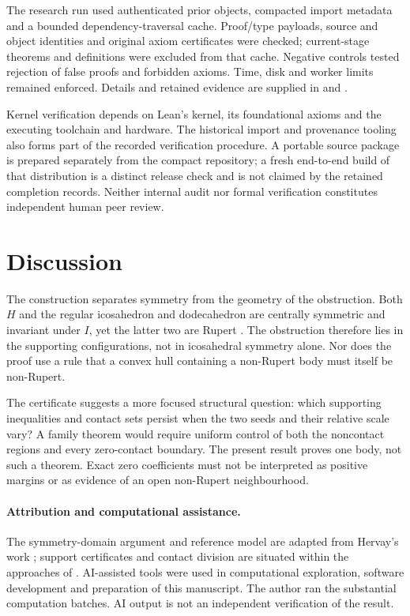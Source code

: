 \documentclass[11pt,a4paper]{article}
\newcommand{\HH}{H}
\begin{document}
The research run used authenticated prior objects, compacted import metadata
and a bounded dependency-traversal cache. Proof/type payloads, source and
object identities and original axiom certificates were checked; current-stage
theorems and definitions were excluded from that cache. Negative controls
tested rejection of false proofs and forbidden axioms. Time, disk and worker
limits remained enforced. Details and retained evidence are supplied in
 and .

Kernel verification depends on Lean's kernel, its foundational axioms and
the executing toolchain and hardware. The historical import and provenance
tooling also forms part of the recorded verification procedure. A portable
source package is prepared separately from the compact repository; a fresh
end-to-end build of that distribution is a distinct release check and is not
claimed by the retained completion records. Neither internal audit nor
formal verification constitutes independent human peer review.

\section{Discussion}
The construction separates symmetry from the geometry of the obstruction.
Both $\HH$ and the regular icosahedron and dodecahedron are centrally symmetric
and invariant under $I$, yet the latter two are Rupert \cite{SYalgorithm}.
The obstruction therefore lies in the supporting configurations, not in
icosahedral symmetry alone. Nor does the proof use a rule that a convex hull
containing a non-Rupert body must itself be non-Rupert.

The certificate suggests a more focused structural question: which supporting
inequalities and contact sets persist when the two seeds and their relative
scale vary? A family theorem would require uniform control of both the
noncontact regions and every zero-contact boundary. The present result proves
one body, not such a theorem. Exact zero coefficients must not be interpreted
as positive margins or as evidence of an open non-Rupert neighbourhood.

\paragraph{Attribution and computational assistance.}
The symmetry-domain argument and reference model are adapted from Hervay's
work \cite{Hervay}; support certificates and contact division are situated
within the approaches of \cite{SYnopert,Hervay,MurphyMethod}.
AI-assisted tools were used in computational exploration, software development
and preparation of this manuscript. The author ran the substantial computation
batches. AI output is not an independent verification of the result.
\end{document}
